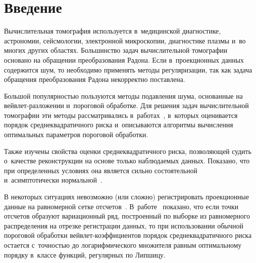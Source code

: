 
 



\thispagestyle{headings}

\begin{multicols}{2}

\label{st\stat}



\section{Введение}

Вычислительная томография используется в~медицинской диагностике, 
астрономии, сейс\-мо\-ло\-гии, электронной микроскопии, диагностике плазмы и~во 
многих других областях. Большинство задач вычислительной томографии 
основано на обращении преобразования Радона. Если в~проекционных данных 
содержится шум, то необходимо применять методы регуляризации, так как 
задача обращения преобразования Радона некорректно по\-став\-лена. 
{

}

Большой 
популярностью пользуются методы подавления шума, основанные на 
вейв\-лет-раз\-ло\-же\-нии и~пороговой обработке. Для решения задач вычислительной 
томографии эти методы рас\-смат\-ри\-ва\-лись в~работах~\cite{D94, Kol94, Lee97}, 
в~которых оценивается порядок среднеквадратичного риска и~описываются 
алгоритмы вычисления оптимальных па\-ра\-мет\-ров пороговой обработки.

 Также 
изучены свойства оценки сред\-не\-квад\-ра\-тич\-но\-го рис\-ка, позволяющей судить 
о~качестве реконструкции на основе только наблюдаемых данных. Показано, 
что при определенных условиях она является сильно состоятельной 
и~асимптотически нормальной~\cite{SH16, SH16-1}.

В некоторых ситуациях невозможно (или сложно) регистрировать проекционные 
данные на равномерной сетке отсчетов~\cite{CB98}. В~работе~\cite{CB99} 
показано, что если точки отсчетов образуют \mbox{вариационный} ряд, построенный 
по выборке из равномерного распределения на отрезке регистрации данных, 
то при использовании обычной пороговой обработки вейв\-лет-ко\-эф\-фи\-ци\-ен\-тов 
порядок среднеквадратичного риска остается с~точностью до 
логарифмического множителя равным оптимальному порядку в~классе функций, 
регулярных по Липшицу. 


\end{multicols}
